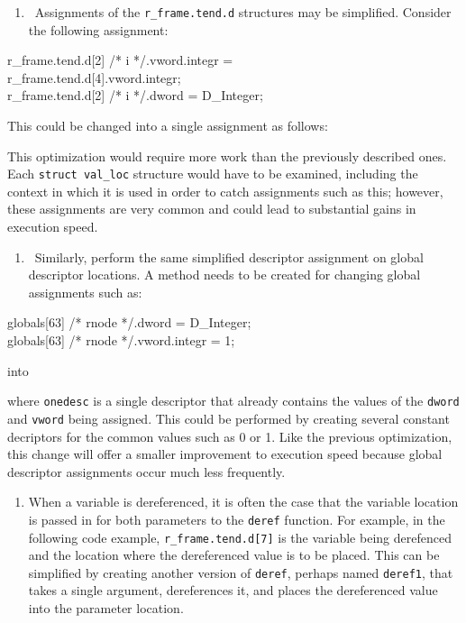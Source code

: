 \liststyleLxxxix
\begin{enumerate}
\item 
\ Assignments of the \texttt{r\_frame.tend.d} structures may be simplified. Consider the following assignment:
\end{enumerate}
\goodbreak
\begin{iconcode}
r\_frame.tend.d[2] /* i */.vword.integr =\\
\>r\_frame.tend.d[4].vword.integr;\\
r\_frame.tend.d[2] /* i */.dword = D\_Integer;\\
\end{iconcode}


This could be changed into a single assignment as follows:



This optimization would require more work than the previously
described ones. Each \texttt{struct val\_loc} structure would have
to be examined, including the context in which it is used in order to
catch assignments such as this; however, these assignments are very
common and could lead to substantial gains in execution speed.

\liststyleLxl
\begin{enumerate}
\item 
\ Similarly, perform the same simplified descriptor assignment on global descriptor locations. A method needs to be
created for changing global assignments such as:
\end{enumerate}
\goodbreak
\begin{iconcode}
globals[63] /* rnode */.dword = D\_Integer;\\
globals[63] /* rnode */.vword.integr = 1;\\
\end{iconcode}

\noindent
into


\noindent where \texttt{onedesc} is a single descriptor that already
contains the values of the \texttt{dword} and \texttt{vword} being
assigned. This could be performed by creating several constant
decriptors for the common values such as 0 or 1.  Like the previous
optimization, this change will offer a smaller improvement to
execution speed because global descriptor assignments occur much less
frequently.

\liststyleLxli
\begin{enumerate}
\item 
When a variable is dereferenced, it is often the case that the
variable location is passed in for both parameters to the
\texttt{deref} function. For example, in the following code example,
\texttt{r\_frame.tend.d[7]} is the variable being derefenced and the
location where the dereferenced value is to be placed. This can be
simplified by creating another version of \texttt{deref}, perhaps
named \texttt{deref1}, that takes a single argument, dereferences it,
and places the dereferenced value into the parameter location.
\end{enumerate}


